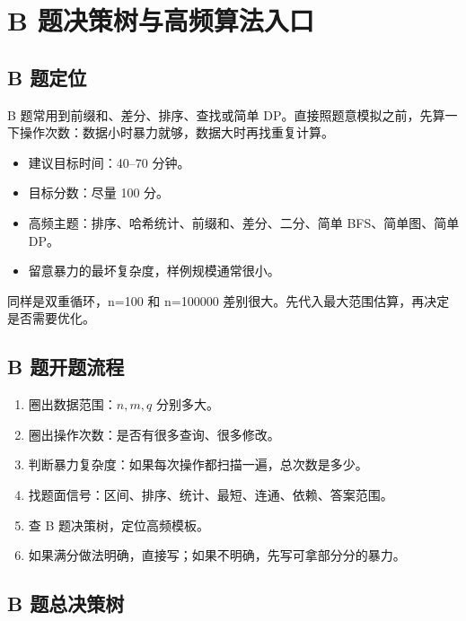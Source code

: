 \chapter{B 题决策树与高频算法入口}\label{ch:06}

\section{B 题定位}\label{sec:06-1}

B 题常用到前缀和、差分、排序、查找或简单 DP。直接照题意模拟之前，先算一下操作次数：数据小时暴力就够，数据大时再找重复计算。

\begin{itemize}
  \item 建议目标时间：40--70 分钟。
  \item 目标分数：尽量 100 分。
  \item 高频主题：排序、哈希统计、前缀和、差分、二分、简单 BFS、简单图、简单 DP。
  \item 留意暴力的最坏复杂度，样例规模通常很小。
\end{itemize}

同样是双重循环，n=100 和 n=100000 差别很大。先代入最大范围估算，再决定是否需要优化。

\section{B 题开题流程}\label{sec:06-2}

\begin{enumerate}
  \item 圈出数据范围：$n,m,q$ 分别多大。
  \item 圈出操作次数：是否有很多查询、很多修改。
  \item 判断暴力复杂度：如果每次操作都扫描一遍，总次数是多少。
  \item 找题面信号：区间、排序、统计、最短、连通、依赖、答案范围。
  \item 查 B 题决策树，定位高频模板。
  \item 如果满分做法明确，直接写；如果不明确，先写可拿部分分的暴力。
\end{enumerate}

\section{B 题总决策树}\label{sec:06-3}

